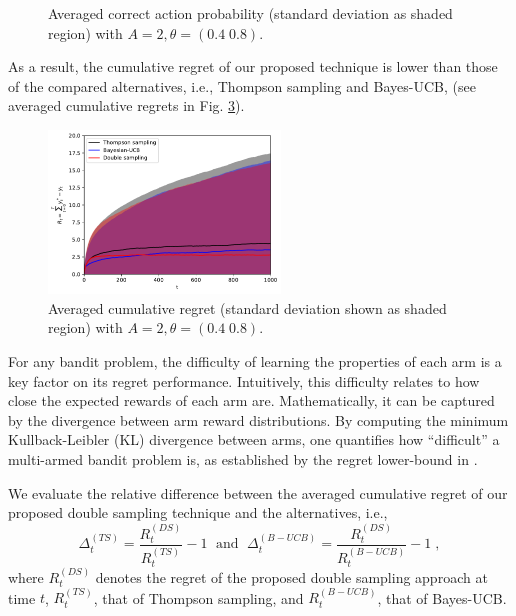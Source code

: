 \documentclass{article}
\newcommand{\ie}{i.e., }
\begin{document}
\begin{figure}[!h]
\begin{subfigure}[b]{0.49\textwidth}
		\label{fig:bernoulli_correct_actions_BUCB_DS}
	\end{subfigure}
	\caption{Averaged correct action probability (standard deviation as shaded region) with $A=2, \theta=\left(0.4 \; 0.8\right)$.}
	\label{fig:bernoulli_correct_actions_compare}
\end{figure}

As a result, the cumulative regret of our proposed technique is lower than those of the compared alternatives, \ie Thompson sampling and Bayes-UCB, (see averaged cumulative regrets in Fig. \ref{fig:bernoulli_cumulative_regret}). 

\begin{figure}[!h]
	\centering
	\includegraphics[width=0.55\textwidth]{./figs/bernoulli/cumulative_regret.pdf}
	\caption{Averaged cumulative regret (standard deviation shown as shaded region) with $A=2, \theta=\left(0.4 \; 0.8\right)$.}
	\label{fig:bernoulli_cumulative_regret}
\end{figure}

For any bandit problem, the difficulty of learning the properties of each arm is a key factor on its regret performance. Intuitively, this difficulty relates to how close the expected rewards of each arm are. Mathematically, it can be captured by the divergence between arm reward distributions. By computing the minimum Kullback-Leibler (KL) divergence between arms, one quantifies how ``difficult'' a multi-armed bandit problem is, as established by the regret lower-bound in \cite{j-Lai1985}. 

We evaluate the relative difference between the averaged cumulative regret of our proposed double sampling technique and the alternatives, \ie
\begin{equation}
\Delta_t^{(TS)} =\frac{R_{t}^{(DS)}}{R_{t}^{(TS)}}-1 \; \text{ and } \; \Delta_t^{(B-UCB)} =\frac{R_{t}^{(DS)}}{R_{t}^{(B-UCB)}}-1 \; ,
\label{eq:relative_cum_reg_dif}
\end{equation}
where $R_t^{(DS)}$ denotes the regret of the proposed double sampling approach at time $t$, $R_t^{(TS)}$, that of Thompson sampling, and $R_t^{(B-UCB)}$, that of Bayes-UCB.
\end{document}
